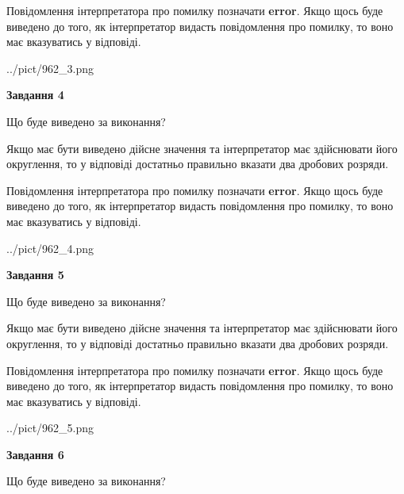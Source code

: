 \documentclass[12pt, ukrainian]{article}
\begin{document}
{\begin {Large}
Повідомлення інтерпретатора про помилку позначати \textbf{error}.
Якщо щось буде виведено до того, як інтерпретатор видасть повідомлення про помилку, 
то воно має вказуватись у відповіді. \par

\begin{center}
	{../pict/962_3.png}
\end{center}
\newpage

{\begin {center}\textbf{Завдання 4}\end {center}}\par
Що буде виведено за виконання? \par

Якщо має бути виведено дійсне значення та інтерпретатор має здійснювати його округлення, 
то у відповіді достатньо правильно вказати два дробових розряди.

Повідомлення інтерпретатора про помилку позначати \textbf{error}.
Якщо щось буде виведено до того, як інтерпретатор видасть повідомлення про помилку, 
то воно має вказуватись у відповіді. \par

\begin{center}
	{../pict/962_4.png}
\end{center}
\newpage

{\begin {center}\textbf{Завдання 5}\end {center}}\par
Що буде виведено за виконання? \par

Якщо має бути виведено дійсне значення та інтерпретатор має здійснювати його округлення, 
то у відповіді достатньо правильно вказати два дробових розряди.

Повідомлення інтерпретатора про помилку позначати \textbf{error}.
Якщо щось буде виведено до того, як інтерпретатор видасть повідомлення про помилку, 
то воно має вказуватись у відповіді. \par

\begin{center}
	{../pict/962_5.png}
\end{center}
\newpage

{\begin {center}\textbf{Завдання 6}\end {center}}\par
Що буде виведено за виконання? \par


\end{Large}}
\end{document}
